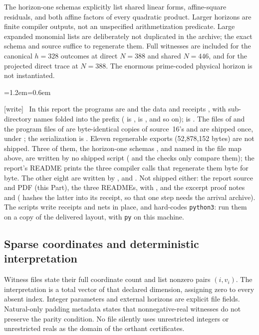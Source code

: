 \documentclass[11pt,letterpaper]{article}
\theoremstyle{definition}
\theoremstyle{remark}
\newcommand{\wtag}{\textup{[write]}}
\newenvironment{writenote}{\par\smallskip\begin{list}{}{\leftmargin=1.2em\rightmargin=0.6em}\item[]\small\wtag\ }{\end{list}\smallskip}
\begin{document}
The horizon-one schemas explicitly list shared linear forms, affine-square residuals, and both affine factors of every quadratic product. Larger horizons are finite compiler outputs, not an unspecified arithmetization predicate. Large expanded monomial lists are deliberately not duplicated in the archive; the exact schema and source suffice to regenerate them. Full witnesses are included for the canonical $h=328$ outcomes at direct $N=388$ and shared $N=446$, and for the projected direct trace at $N=388$. The enormous prime-coded physical horizon is not instantiated.

\begin{writenote}
In this report the programs are  and the data and receipts , with sub-directory names folded into the prefix ( is ,  is , and so on);  is . The files of  and the program files of  are byte-identical copies of source~16's and are shipped once, under ; the serialization is . Eleven regenerable exports (52,878,152 bytes) are not shipped. Three of them, the horizon-one schemas ,  and  named in the file map above, are written by no shipped script ( and the checks only compare them); the report's README prints the three compiler calls that regenerate them byte for byte. The other eight are written by ,  and . Not shipped either: the report source and PDF (this Part), the three READMEs,  with , and the excerpt proof notes  and  ( hashes the latter into its receipt, so that one step needs the arrival archive). The scripts write receipts and nets in place, and  hard-codes \texttt{python3}: run them on a copy of the delivered layout, with \texttt{py} on this machine.
\end{writenote}


\subsection{Sparse coordinates and deterministic interpretation}
Witness files state their full coordinate count and list nonzero pairs $(i,v_i)$. The interpretation is a total vector of that declared dimension, assigning zero to every absent index. Integer parameters and external horizons are explicit file fields. Natural-only padding metadata states that nonnegative-real witnesses do not preserve the parity condition. No file silently uses unrestricted integers or unrestricted reals as the domain of the orthant certificates.
\end{document}
